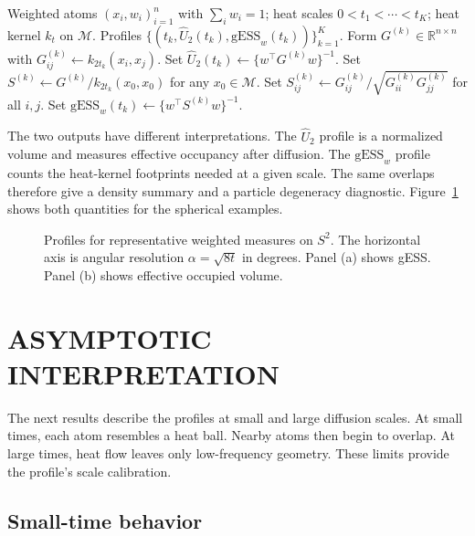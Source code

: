 \documentclass[twoside]{article}
\theoremstyle{definition}
\theoremstyle{remark}
\newcommand{\M}{\mathcal{M}}
\newcommand{\gess}{\mathrm{gESS}}
\begin{document}
\begin{algorithm}[t]
\caption{Heat entropy profile and geometric effective sample size}
\label{alg:heat-gess}
\small
\begin{algorithmic}[1]
\REQUIRE Weighted atoms $(x_i,w_i)_{i=1}^n$ with $\sum_iw_i=1$; heat scales
$0<t_1<\cdots<t_K$; heat kernel $k_t$ on $\M$.
\ENSURE Profiles $\{(t_k,\widehat U_2(t_k),\gess_w(t_k))\}_{k=1}^K$.
  \STATE Form $G^{(k)}\in\mathbb R^{n\times n}$ with
  $G^{(k)}_{ij}\gets k_{2t_k}(x_i,x_j)$.
  \STATE Set $\widehat U_2(t_k)\gets \{w^\top G^{(k)}w\}^{-1}$.
  \IF{$\M$ is homogeneous}
    \STATE Set $S^{(k)}\gets G^{(k)}/k_{2t_k}(x_0,x_0)$ for any $x_0\in\M$.
  \ELSE
    \STATE Set $S^{(k)}_{ij}\gets
    G^{(k)}_{ij}/\sqrt{G^{(k)}_{ii}G^{(k)}_{jj}}$ for all $i,j$.
  \ENDIF
  \STATE Set $\gess_w(t_k)\gets\{w^\top S^{(k)}w\}^{-1}$.
\ENDFOR
\end{algorithmic}
\end{algorithm}

The two outputs have different interpretations. The $\widehat U_2$ profile is a normalized volume and measures effective occupancy after diffusion. The $\gess_w$ profile counts the heat-kernel footprints needed at a given scale. The same overlaps therefore give a density summary and a particle degeneracy diagnostic. Figure~\ref{fig:profiles} shows both quantities for the spherical examples.

\begin{figure}[ht]
\centering

\caption{Profiles for representative weighted measures on $S^2$. The horizontal axis is angular resolution $\alpha=\sqrt{8t}$ in degrees.
Panel (a) shows gESS. Panel (b) shows effective occupied volume.}
\label{fig:profiles}
\end{figure}


\section{ASYMPTOTIC INTERPRETATION}

The next results describe the profiles at small and large diffusion scales. At small times, each atom resembles a heat ball. Nearby atoms then begin to overlap. At large times, heat flow leaves only low-frequency geometry. These limits provide the profile's scale calibration.

\subsection{Small-time behavior}
\end{document}

